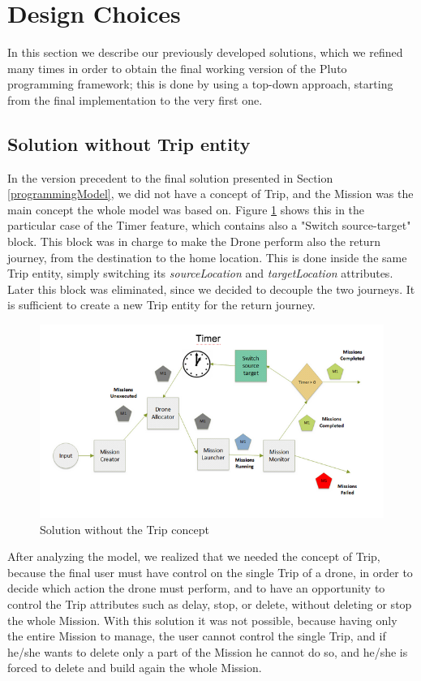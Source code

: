\section{Design Choices}\label{history}

In this section we describe our previously developed solutions, which we refined many times in order to obtain the final working version of the Pluto programming framework; this is done by using a top-down approach, starting from the final implementation to the very first one.

\subsection{Solution without Trip entity}

In the version precedent to the final solution presented in Section \ref{programmingModel}, we did not have a concept of Trip, and the Mission was the main concept the whole model was based on. 
Figure \ref{fig:noTrip} shows this in the particular case of the Timer feature, which contains also a "Switch source-target" block. 
This block was in charge to make the Drone perform also the return journey, from the destination to the home location.
This is done inside the same Trip entity, simply switching its \textit{sourceLocation} and \textit{targetLocation} attributes.
Later this block was eliminated, since we decided to decouple the two journeys.
It is sufficient to create a new Trip entity for the return journey.

\begin{figure}[H]
  \centering
  \includegraphics[width=\linewidth]{pictures/NoTrip.png}
  \caption{Solution without the Trip concept}
  \label{fig:noTrip}
\end{figure}

After analyzing the model, we realized that we needed the concept of Trip, because the final user must have control on the single Trip of a drone, in order to decide which action the drone must perform, and to have an opportunity to control the Trip attributes such as delay, stop, or delete, without deleting or stop the whole Mission. 
With this solution it was not possible, because having only the entire Mission to manage, the user cannot control the single Trip, and if he/she wants to delete only a part of the Mission he cannot do so, and he/she is forced to delete and build again the whole Mission.

